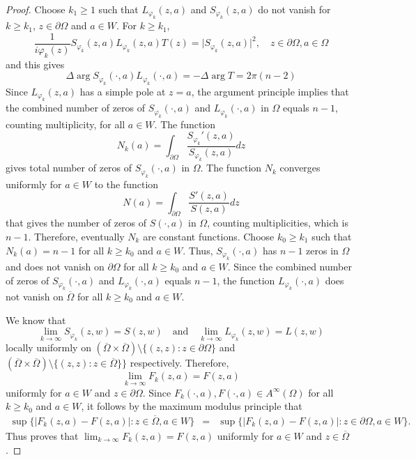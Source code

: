 \documentclass[11pt, reqno]{amsart}
\numberwithin{equation}{section}
\newcommand{\ov}{\overline}
\newcommand{\Om}{\Omega}
\begin{document}
	\begin{proof}
		Choose $k_1 \ge 1$ such that $L_{\varphi_k}(z,a)$ and $S_{\varphi_k}(z,a)$ do not vanish for $k\geq k_1$, $z\in \partial\Om$ and $a\in W$. For $k\geq k_1$, 
		\[
		\frac{1}{i\varphi_k(z)}S_{\varphi_k}(z,a)L_{\varphi_k}(z,a) T(z) = \vert S_{\varphi_k}(z,a)\vert^2,
		\quad z\in\partial\Om, a\in\Om
		\]
		and this gives
		\[
		\Delta \arg S_{\varphi_k}(\cdot, a)L_{\varphi_k}(\cdot, a) = -\Delta \arg T = 2\pi (n-2)
		\]
		Since $L_{\varphi_k}(z,a)$ has a simple pole at $z=a$, the argument principle implies that the combined number of zeros of $S_{\varphi_k}(\cdot,a)$ and $L_{\varphi_k}(\cdot,a)$ in $\Om$ equals $n-1$, counting multiplicity, for all $a\in W$. The function
		\[
		N_k(a) = \int_{\partial \Om}\frac{{S_{\varphi_k}}'(z,a)}{S_{\varphi_k}(z,a)} dz
		\]
		gives total number of zeros of $S_{\varphi_k}(\cdot,a)$ in $\Om$. The function $N_k$ converges uniformly for $a\in W$ to the function
		\[
		N(a) =  \int_{\partial \Om}\frac{S'(z,a)}{S(z,a)} dz
		\]
		that gives the number of zeros of $S(\cdot,a)$ in $\Om$, counting multiplicities, which is $n-1$. Therefore, eventually $N_k$ are constant functions. Choose $k_0\geq k_1$ such that $N_k(a) = n-1$ for all $k\geq k_0$ and $a\in W$. Thus, $S_{\varphi_k}(\cdot,a)$ has $n-1$ zeros in $\Om$ and does not vanish on $\partial\Om$ for all $k\geq k_0$ and $a\in W$. Since the combined number of zeros of $S_{\varphi_k}(\cdot,a)$ and $L_{\varphi_k}(\cdot,a)$ equals $n-1$, the function $L_{\varphi_k}(\cdot,a)$ does not vanish on $\overline{\Om}$ for all $k\geq k_0$ and $a\in W$.
		
		\medskip
		
		We know that
		\[
		\lim_{k\rightarrow\infty} S_{\varphi_k}(z,w) = S(z,w)
		\quad \text{and}\quad
		\lim_{k\rightarrow\infty} L_{\varphi_k}(z,w) = L(z,w)
		\]
		locally uniformly on $(\ov{\Om}\times\ov{\Om})\setminus \{(z,z): z\in\partial\Om\}$ and $(\ov{\Om}\times\ov{\Om})\setminus \{(z,z): z\in \overline{\Om}\}\}$ respectively. Therefore,
		\[
		\lim_{k\rightarrow\infty} F_k(z,a) = F(z,a)
		\]
		uniformly for $a\in W$ and $z\in\partial\Om$. Since $F_k(\cdot,a),F(\cdot,a)\in A^{\infty}(\Om)$ for all $k\geq k_0$ and $a\in W$, it follows by the maximum modulus principle that 
		\begin{eqnarray*}
			\sup\{ \vert F_k(z,a) - F(z,a)\vert : z \in \overline{\Om}, a\in W\} 
			&=&
			\sup\{ \vert F_k(z,a) - F(z,a)\vert : z \in \partial\Om, a\in W\}.
		\end{eqnarray*}
		Thus proves that $\lim_{k\rightarrow\infty} F_k(z,a) = F(z,a)$ uniformly for $a\in W$ and $z\in\overline{\Om}$.
	\end{proof}
\end{document}
